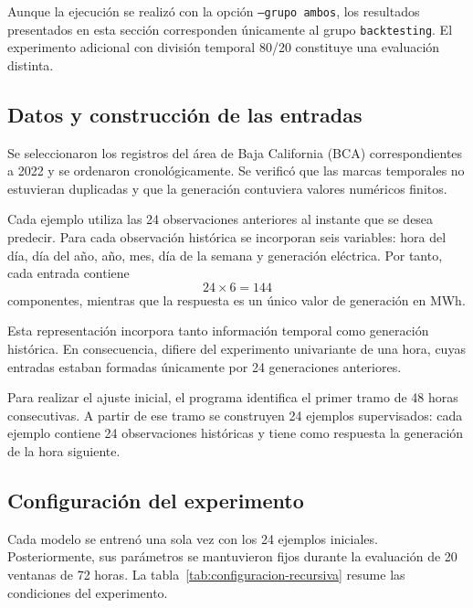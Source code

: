 Aunque la ejecución se realizó con la opción \texttt{--grupo ambos}, los resultados presentados en esta sección corresponden únicamente al grupo \texttt{backtesting}. El experimento adicional con división temporal 80/20 constituye una evaluación distinta.

\subsection{Datos y construcción de las entradas}

Se seleccionaron los registros del área de Baja California (BCA) correspondientes a 2022 y se ordenaron cronológicamente. Se verificó que las marcas temporales no estuvieran duplicadas y que la generación contuviera valores numéricos finitos.

Cada ejemplo utiliza las 24 observaciones anteriores al instante que se desea predecir. Para cada observación histórica se incorporan seis variables: hora del día, día del año, año, mes, día de la semana y generación eléctrica. Por tanto, cada entrada contiene
\[
24\times6=144
\]
componentes, mientras que la respuesta es un único valor de generación en MWh.

Esta representación incorpora tanto información temporal como generación histórica. En consecuencia, difiere del experimento univariante de una hora, cuyas entradas estaban formadas únicamente por 24 generaciones anteriores.

Para realizar el ajuste inicial, el programa identifica el primer tramo de 48 horas consecutivas. A partir de ese tramo se construyen 24 ejemplos supervisados: cada ejemplo contiene 24 observaciones históricas y tiene como respuesta la generación de la hora siguiente.

\subsection{Configuración del experimento}

Cada modelo se entrenó una sola vez con los 24 ejemplos iniciales. Posteriormente, sus parámetros se mantuvieron fijos durante la evaluación de 20 ventanas de 72 horas. La tabla~\ref{tab:configuracion-recursiva} resume las condiciones del experimento.

